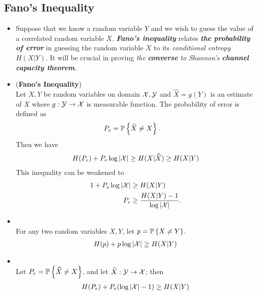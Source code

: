 \documentclass[11pt]{article}
\begin{document}
\subsection{Fano's Inequality}
\begin{itemize}
\item \begin{remark}
Suppose that we know a random variable $Y$ and we wish to guess the value of a correlated random variable $X$. \emph{\textbf{Fano's inequality}} relates \emph{\textbf{the probability of error}} in guessing the random variable $X$ to its \emph{conditional entropy} $H(X|Y)$. It will be crucial in proving \emph{the \textbf{converse} to Shannon's \textbf{channel capacity theorem}}.
\end{remark}

\item \begin{proposition} (\textbf{Fano's Inequality})\citep{thomas2006elements} \\
Let $X, Y$ be random variables on domain ${\mathcal X}, {\mathcal Y}$ and $\widehat{X} = g(Y)$ is an estimate of $X$ where $g: {\mathcal Y} \to {\mathcal X}$ is measurable function. The probability of error is defined as
\begin{align*}
P_{e} &= {\mathbb P}\left\{\widehat{X} \neq X\right\}.
\end{align*} Then we have
\begin{align}
H(P_{e}) + P_{e}\log \left\lvert {\mathcal X} \right\rvert \ge H(X | \widehat{X}) \ge H(X | Y) \label{ineqn: fano_inequality}
\end{align} This inequality can be weakened to
\begin{align}
1+ P_{e}\log \left\lvert {\mathcal X} \right\rvert &\ge H(X|Y) \label{ineqn: fano_inequality_2}\\
P_{e} &\ge \frac{H(X|Y) - 1}{\log \left\lvert {\mathcal X} \right\rvert}.  \label{ineqn: fano_inequality_3}
\end{align}
\end{proposition}

\item \begin{corollary}\citep{thomas2006elements} \\
For any two random variables $X, Y$, let $p = {\mathbb P}\left\{X \neq Y\right\}$. 
\begin{align}
H(p) + p\log \left\lvert {\mathcal X} \right\rvert \ge H(X | Y) \label{ineqn: fano_inequality_4}
\end{align}
\end{corollary}

\item \begin{corollary}\citep{thomas2006elements} \\
Let  $P_{e} = {\mathbb P}\left\{\widehat{X} \neq X\right\}$, and let $\widehat{X}: {\mathcal Y} \to {\mathcal X}$; then
\begin{align}
H(P_{e}) + P_{e}(\log \left\lvert {\mathcal X} \right\rvert - 1) \ge H(X | Y) \label{ineqn: fano_inequality_5}
\end{align}
\end{corollary}


\end{itemize}
\end{document}
